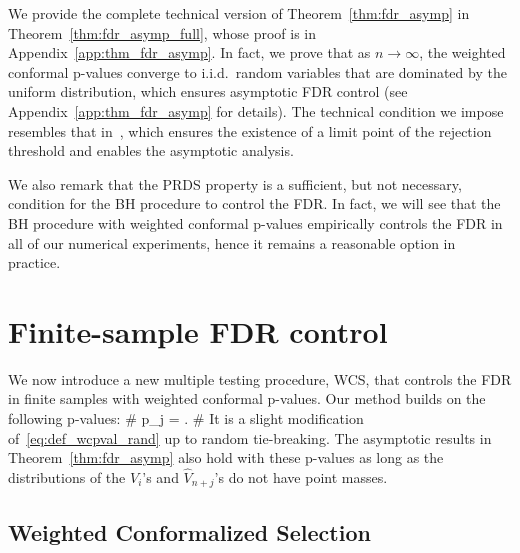 We provide the complete technical version of Theorem~\ref{thm:fdr_asymp}
in Theorem~\ref{thm:fdr_asymp_full}, whose
proof is in Appendix~\ref{app:thm_fdr_asymp}.
In fact, we prove that as $n\to \infty$, the weighted conformal p-values
converge to i.i.d.~random variables that are dominated by the uniform distribution,
which ensures asymptotic FDR control (see Appendix~\ref{app:thm_fdr_asymp} for details).
The technical condition  we impose resembles that in~\cite{storey2004strong},
which ensures the existence of a limit point of the rejection threshold and enables the asymptotic analysis.

We also  remark that
the PRDS property is a sufficient, but not necessary, condition for
the BH procedure to control the FDR.
In fact, we will see  that
the BH procedure with weighted conformal p-values
empirically controls
the FDR in all of our numerical experiments, hence it
remains a reasonable option in practice.
\section{Finite-sample FDR control}
\label{sec:method}
We now introduce a new
multiple testing procedure, WCS, that
controls the FDR in finite samples with weighted conformal p-values.
Our method builds on the following p-values:
\#\label{eq:weighted_pval}
{p}_j = .
\#
It is a slight modification of~\eqref{eq:def_wcpval_rand} up to
random tie-breaking. The asymptotic results in
Theorem~\ref{thm:fdr_asymp} also hold with these
p-values as long as the distributions of the $V_i$'s and
$\hat{V}_{n+j}$'s do not have point masses.

\subsection{Weighted Conformalized Selection}

